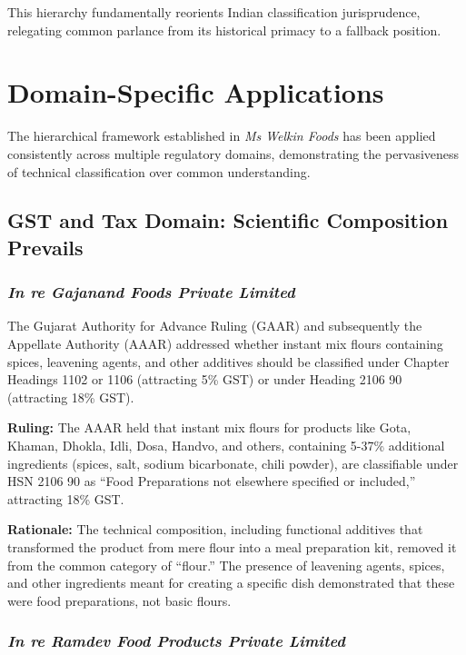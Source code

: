 \documentclass[12pt,a4paper]{article}
\begin{document}
This hierarchy fundamentally reorients Indian classification jurisprudence, relegating common parlance from its historical primacy to a fallback position.

\section{Domain-Specific Applications}

The hierarchical framework established in \textit{Ms Welkin Foods} has been applied consistently across multiple regulatory domains, demonstrating the pervasiveness of technical classification over common understanding.

\subsection{GST and Tax Domain: Scientific Composition Prevails}

\subsubsection{\textit{In re Gajanand Foods Private Limited}}

The Gujarat Authority for Advance Ruling (GAAR) and subsequently the Appellate Authority (AAAR) addressed whether instant mix flours containing spices, leavening agents, and other additives should be classified under Chapter Headings 1102 or 1106 (attracting 5\% GST) or under Heading 2106 90 (attracting 18\% GST).

\textbf{Ruling:} The AAAR held that instant mix flours for products like Gota, Khaman, Dhokla, Idli, Dosa, Handvo, and others, containing 5-37\% additional ingredients (spices, salt, sodium bicarbonate, chili powder), are classifiable under HSN 2106 90 as ``Food Preparations not elsewhere specified or included,'' attracting 18\% GST.

\textbf{Rationale:} The technical composition, including functional additives that transformed the product from mere flour into a meal preparation kit, removed it from the common category of ``flour.'' The presence of leavening agents, spices, and other ingredients meant for creating a specific dish demonstrated that these were food preparations, not basic flours.

\subsubsection{\textit{In re Ramdev Food Products Private Limited}}
\end{document}
